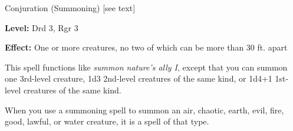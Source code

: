 
Conjuration (Summoning) [see text]

\textbf{Level:} Drd 3, Rgr 3

\textbf{Effect:} One or more creatures, no two of which can be more than 30 ft. 
apart

This spell functions like \textit{summon nature's ally I}, except that you can 
summon one 3rd-level creature, 1d3 2nd-level creatures of the same kind, or 1d4+1 
1st-level creatures of the same kind.

When you use a summoning spell to summon an air, chaotic, earth, evil, fire, good, 
lawful, or water creature, it is a spell of that type. 

